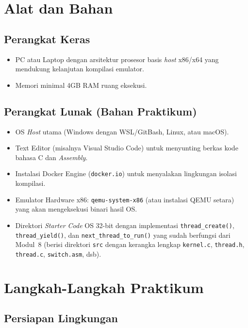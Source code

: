 \newpage
\section{Alat dan Bahan}
\label{sec:m11-alat-bahan}

\subsection{Perangkat Keras}
\begin{itemize}
	\item PC atau Laptop dengan arsitektur prosesor basis \textit{host} x86/x64 yang mendukung kelanjutan kompilasi emulator.
	\item Memori minimal 4GB RAM ruang eksekusi.
\end{itemize}

\subsection{Perangkat Lunak (Bahan Praktikum)}
\begin{itemize}
	\item OS \textit{Host} utama (Windows dengan WSL/GitBash, Linux, atau macOS).
	\item Text Editor (misalnya Visual Studio Code) untuk menyunting berkas kode bahasa C dan \textit{Assembly}.
	\item Instalasi Docker Engine (\texttt{docker.io}) untuk menyalakan lingkungan isolasi kompilasi.
	\item Emulator Hardware x86: \texttt{qemu-system-x86} (atau instalasi QEMU setara) yang akan mengeksekusi binari hasil OS.
	\item Direktori \textit{Starter Code} OS 32-bit dengan implementasi \texttt{thread\_create()}, \texttt{thread\_yield()}, dan \texttt{next\_thread\_to\_run()} yang sudah berfungsi dari Modul~8 (berisi direktori \texttt{src} dengan kerangka lengkap \texttt{kernel.c}, \texttt{thread.h}, \texttt{thread.c}, \texttt{switch.asm}, dsb).
\end{itemize}

\newpage
\section{Langkah-Langkah Praktikum}

\subsection{Persiapan Lingkungan}
\label{sec:m11-persiapan}

